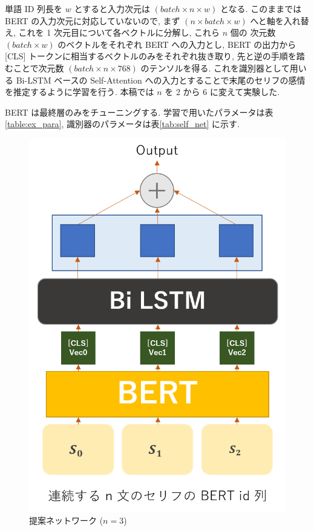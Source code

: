 \documentclass[twocolumn]{jarticle}     %
\begin{document}
単語 ID 列長を $w$ とすると入力次元は $(batch \times n \times w)$ となる. このままでは BERT の入力次元に対応していないので, まず $(n \times batch \times w)$ へと軸を入れ替え, これを 1 次元目について各ベクトルに分解し, これら $n$ 個の 次元数 $(batch \times w)$ のベクトルをそれぞれ BERT への入力とし, BERT の出力から [CLS] トークンに相当するベクトルのみをそれぞれ抜き取り, 先と逆の手順を踏むことで次元数 $(batch \times n \times 768)$ のテンソルを得る. これを識別器として用いる Bi-LSTM ベースの Self-Attention への入力とすることで末尾のセリフの感情を推定するように学習を行う. 本稿では $n$ を 2 から 6 に変えて実験した.

BERT は最終層のみをチューニングする. 学習で用いたパラメータは表\ref{table:ex_para}, 識別器のパラメータは表\ref{tab:self_net} に示す.

\begin{figure}[!htb]
  \begin{center}
    \includegraphics[scale=0.5]{seq_net.png}
    \caption{提案ネットワーク ($n = 3$)} %
    \label{fig:net} %
  \end{center}
\end{figure}
\end{document}
